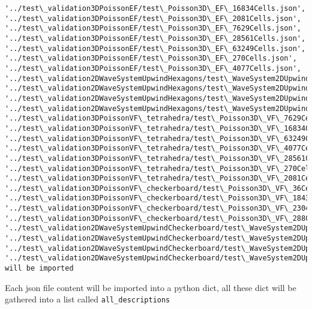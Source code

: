 \documentclass[11pt]{article}
\begin{document}
\begin{Verbatim}[commandchars=\\\{\}]
'../test\_validation3DPoissonEF/test\_Poisson3D\_EF\_16834Cells.json', '../test\_validation3DPoissonEF/test\_Poisson3D\_EF\_2081Cells.json', '../test\_validation3DPoissonEF/test\_Poisson3D\_EF\_7629Cells.json', '../test\_validation3DPoissonEF/test\_Poisson3D\_EF\_28561Cells.json', '../test\_validation3DPoissonEF/test\_Poisson3D\_EF\_63249Cells.json', '../test\_validation3DPoissonEF/test\_Poisson3D\_EF\_270Cells.json', '../test\_validation3DPoissonEF/test\_Poisson3D\_EF\_4077Cells.json', '../test\_validation2DWaveSystemUpwindHexagons/test\_WaveSystem2DUpwind\_squareWithHexagons255Cells.json', '../test\_validation2DWaveSystemUpwindHexagons/test\_WaveSystem2DUpwind\_squareWithHexagons25Cells.json', '../test\_validation2DWaveSystemUpwindHexagons/test\_WaveSystem2DUpwind\_squareWithHexagons1020Cells.json', '../test\_validation2DWaveSystemUpwindHexagons/test\_WaveSystem2DUpwind\_squareWithHexagons2850Cells.json', '../test\_validation3DPoissonVF\_tetrahedra/test\_Poisson3D\_VF\_7629Cells.json', '../test\_validation3DPoissonVF\_tetrahedra/test\_Poisson3D\_VF\_16834Cells.json', '../test\_validation3DPoissonVF\_tetrahedra/test\_Poisson3D\_VF\_63249Cells.json', '../test\_validation3DPoissonVF\_tetrahedra/test\_Poisson3D\_VF\_4077Cells.json', '../test\_validation3DPoissonVF\_tetrahedra/test\_Poisson3D\_VF\_28561Cells.json', '../test\_validation3DPoissonVF\_tetrahedra/test\_Poisson3D\_VF\_270Cells.json', '../test\_validation3DPoissonVF\_tetrahedra/test\_Poisson3D\_VF\_2081Cells.json', '../test\_validation3DPoissonVF\_checkerboard/test\_Poisson3D\_VF\_36Cells.json', '../test\_validation3DPoissonVF\_checkerboard/test\_Poisson3D\_VF\_18432Cells.json', '../test\_validation3DPoissonVF\_checkerboard/test\_Poisson3D\_VF\_2304Cells.json', '../test\_validation3DPoissonVF\_checkerboard/test\_Poisson3D\_VF\_288Cells.json', '../test\_validation2DWaveSystemUpwindCheckerboard/test\_WaveSystem2DUpwind\_squareWithCheckerboard40Cells.json', '../test\_validation2DWaveSystemUpwindCheckerboard/test\_WaveSystem2DUpwind\_squareWithCheckerboard2560Cells.json', '../test\_validation2DWaveSystemUpwindCheckerboard/test\_WaveSystem2DUpwind\_squareWithCheckerboard160Cells.json', '../test\_validation2DWaveSystemUpwindCheckerboard/test\_WaveSystem2DUpwind\_squareWithCheckerboard640Cells.json']
will be imported

    \end{Verbatim}

    Each json file content will be imported into a python dict, all these
dict will be gathered into a list called \texttt{all\_descriptions}
\end{document}
